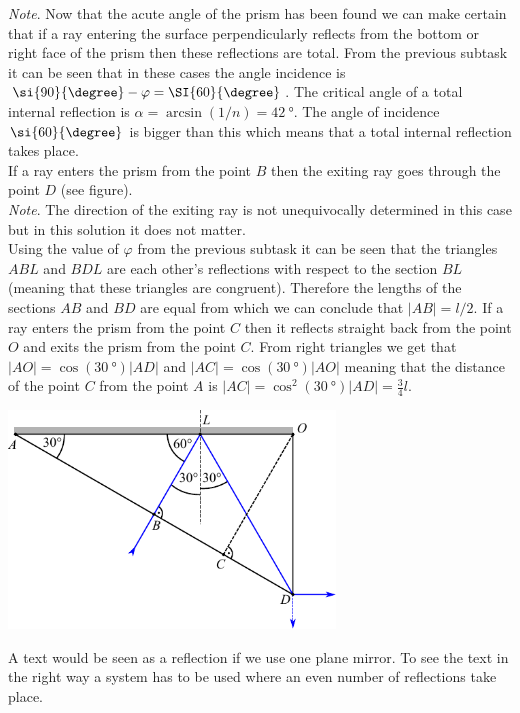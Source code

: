 {\begin{center}
\end{center}
\emph{Note}. Now that the acute angle of the prism has been found we can make certain that if a ray entering the surface perpendicularly reflects from the bottom or right face of the prism then these reflections are total. From the previous subtask it can be seen that in these cases the angle incidence is $\si{90}{\degree}-\varphi=\SI{60}{\degree}$. The critical angle of a total internal reflection is $\alpha=\arcsin(1/n)=\SI{42}{\degree}$. The angle of incidence $\si{60}{\degree}$ is bigger than this which means that a total internal reflection takes place.\\
\osa If a ray enters the prism from the point $B$ then the exiting ray goes through the point $D$ (see figure). \\
\emph{Note}. The direction of the exiting ray is not unequivocally determined in this case but in this solution it does not matter.\\
Using the value of $\varphi$ from the previous subtask it can be seen that the triangles $ABL$ and $BDL$ are each other’s reflections with respect to the section $BL$ (meaning that these triangles are congruent). Therefore the lengths of the sections $AB$ and $BD$ are equal from which we can conclude that $|AB|=l/2$. If a ray enters the prism from the point $C$ then it reflects straight back from the point $O$ and exits the prism from the point $C$. From right triangles we get that $|AO|=\cos(\SI{30}{\degree})|AD|$ and $|AC|=\cos(\SI{30}{\degree})|AO|$ meaning that the distance of the point $C$ from the point $A$ is $|AC|=\cos^2(\SI{30}{\degree})|AD|=\frac{3}{4}l$. 
\begin{center}
  \includegraphics[width=0.65\textwidth]{2014-v3g-04-periskoopprillid_lahendus_joonis3}
\end{center}
\osa A text would be seen as a reflection if we use one plane mirror. To see the text in the right way a system has to be used where an even number of reflections take place.
\fi
}